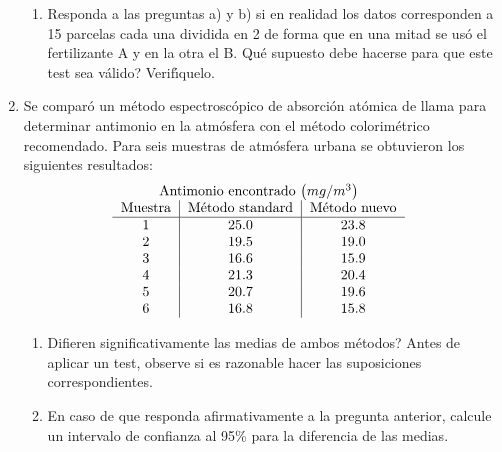 \documentclass[11pt,a4paper,twoside]{article}%
\begin{document}
\begin{enumerate}
\begin{enumerate}
\item Responda a las preguntas a) y b) si en realidad los datos corresponden a
15 parcelas cada una dividida en 2 de forma que en una mitad se us\'{o} el
fertilizante A y en la otra el B. \textquestiondown Qu\'{e} supuesto debe
hacerse para que este test sea v\'{a}lido? Verif\'{\i}quelo.
\end{enumerate}

\item Se compar\'{o} un m\'{e}todo espectrosc\'{o}pico de absorci\'{o}n
at\'{o}mica de llama para determinar antimonio en la atm\'{o}sfera con el
m\'{e}todo colorim\'{e}trico recomendado. Para seis muestras de atm\'{o}sfera
urbana se obtuvieron los siguientes resultados:%
\[%
\begin{tabular}
[c]{c|c|c}%
\multicolumn{3}{c}{Antimonio encontrado $\left(  mg/m^{3}\right)  $}\\
Muestra & M\'{e}todo standard & M\'{e}todo nuevo\\\hline
1 & 25.0 & 23.8\\
2 & 19.5 & 19.0\\
3 & 16.6 & 15.9\\
4 & 21.3 & 20.4\\
5 & 20.7 & 19.6\\
6 & 16.8 & 15.8
\end{tabular}
\ \
\]


\begin{enumerate}
\item \textquestiondown Difieren significativamente las medias de ambos
m\'{e}todos? Antes de aplicar un test, observe si es razonable hacer las
suposiciones correspondientes.

\item En caso de que responda afirmativamente a la pregunta anterior, calcule
un intervalo de confianza al 95\% para la diferencia de las medias.


\end{enumerate}



\end{enumerate}
\end{document}
